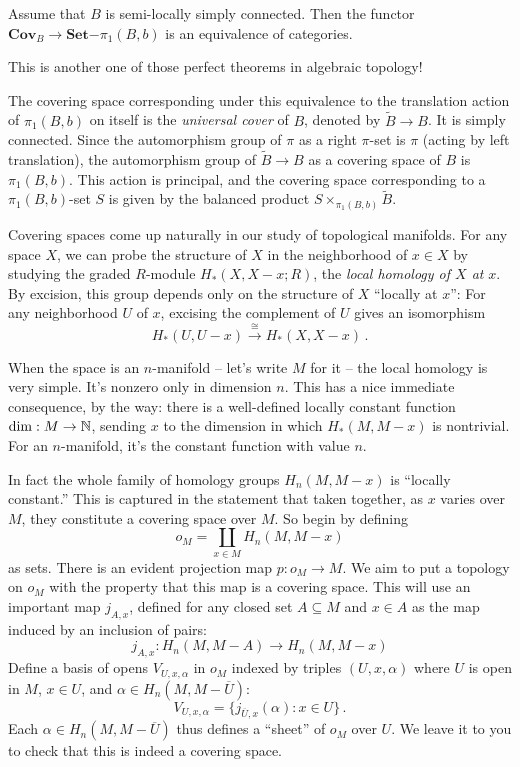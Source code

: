 \begin{theorem} Assume that $B$ is semi-locally simply connected.
Then the functor 
$\mathbf{Cov}_B\to\mathbf{Set}\mathrm{-}\pi_1(B,b)$ is an equivalence of 
categories. 
\end{theorem}

This is another one of those perfect theorems in algebraic topology! 

The covering space corresponding under this equivalence to the translation
action of $\pi_1(B,b)$ on itself is the {\em universal cover} of $B$,
denoted by $\widetilde B\to B$. It is simply connected. 
Since the automorphism group of $\pi$ as
a right $\pi$-set is $\pi$ (acting by left translation), the automorphism
group of $\widetilde B\to B$ as a covering space of $B$ is $\pi_1(B,b)$. 
This action is principal, and the covering space corresponding to 
a $\pi_1(B,b)$-set $S$ is given by the balanced product 
$S\times_{\pi_1(B,b)}\widetilde B$. 

\medskip
Covering spaces come up naturally in our study of topological manifolds. 
For any space $X$, we can probe the structure of $X$ in the neighborhood
of $x\in X$ by studying the graded $R$-module $H_*(X,X-x;R)$, the
{\em local homology of $X$ at} $x$. By excision, this group depends only
on the structure of $X$ ``locally at $x$'': For any neighborhood $U$ of $x$,
excising the complement of $U$ gives an isomorphism
\[
H_*(U,U-x)\xrightarrow{\cong} H_*(X,X-x)\,.
\]

When the space is an $n$-manifold -- let's write $M$ for it -- the local
homology is very simple. It's nonzero only in dimension $n$. This has a
nice immediate consequence, by the way: there is a well-defined 
locally constant function
$\dim:M\to\mathbb N$, sending $x$ to the dimension in which $H_*(M,M-x)$ is 
nontrivial. For an $n$-manifold, it's the constant function with value $n$.

In fact the whole family of homology groups $H_n(M,M-x)$ 
is ``locally constant.'' 
This is captured in the statement that taken together, as $x$ varies over
$M$, they constitute a covering space over $M$. So begin by defining
\[
o_M=\coprod_{x\in M}H_n(M,M-x)
\]
as sets.
There is an evident projection map $p:o_M\to M$. We aim to put a topology on
$o_M$ with the property that this map is a covering space. This will use
an important map $j_{A,x}$, defined for any closed set $A\subseteq M$ 
and $x\in A$ as the map induced by an inclusion of pairs: 
\[
j_{A,x}:H_n(M,M-A)\to H_n(M,M-x)
\]
Define a basis of opens $V_{U,x,\alpha}$ in $o_M$ 
indexed by triples $(U,x,\alpha)$ where $U$ is 
open in $M$, $x\in U$, and $\alpha\in H_n(M,M-\overline U)$:
\[
V_{U,x,\alpha}=\{j_{\overline{U},x}(\alpha):x\in U\}\,.
\]
Each $\alpha\in H_n(M,M-\overline U)$ thus defines a ``sheet'' of $o_M$
over $U$. We leave it to you to check that this is indeed a covering space. 

